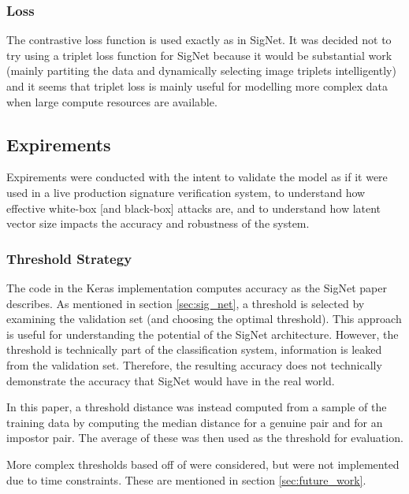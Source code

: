 \subsubsection{Loss}
The contrastive loss function is used exactly as in SigNet\cite{GitHub_sounakdey}.
It was decided not to try using a triplet loss function for SigNet because it would be substantial work (mainly partiting the data and dynamically selecting image triplets intelligently) and it seems that triplet loss is mainly useful for modelling more complex data when large compute resources are available.


\subsection{Expirements}

Expirements were conducted with the intent to validate the model as if it were used in a live production signature verification system, to understand how effective white-box [and black-box] attacks are, and to understand how latent vector size impacts the accuracy and robustness of the system.

\subsubsection{Threshold Strategy}

The code in the Keras implementation computes accuracy as the SigNet paper describes.
As mentioned in section \ref{sec:sig_net}, a threshold is selected by examining the validation set (and choosing the optimal threshold).
This approach is useful for understanding the potential of the SigNet architecture.
However, the threshold is technically part of the classification system, information is leaked from the validation set.
Therefore, the resulting accuracy does not technically demonstrate the accuracy that SigNet would have in the real world.

In this paper, a threshold distance was instead computed from a sample of the training data by computing the median distance for a genuine pair and for an impostor pair.
The average of these was then used as the threshold for evaluation.

More complex thresholds based off of \cite{LeCun} were considered, but were not implemented due to time constraints.
These are mentioned in section \ref{sec:future_work}.



